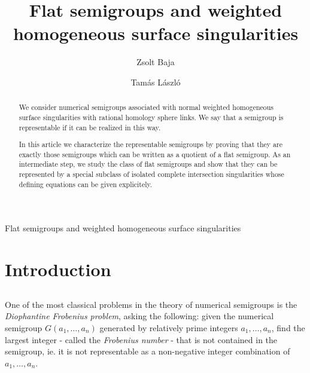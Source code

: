 \documentclass[oneside]{amsart}
\author{Zsolt Baja}
\author{Tam\'as L\'aszl\'o}
\title{Flat semigroups and weighted homogeneous surface singularities}
\numberwithin{equation}{section}
\numberwithin{equation}{subsection}
\theoremstyle{plain}
\theoremstyle{definition}
\begin{document}


\begin{abstract}
We consider numerical semigroups associated with normal weighted homogeneous surface singularities with rational homology sphere links. We say that a semigroup is representable if it can be realized in this way.

In this article we characterize the representable semigroups by proving that they are exactly those semigroups which can be written as a quotient of a flat semigroup. As an intermediate step, we study the class of flat semigroups and show that they can be represented by a special subclass of isolated complete intersection singularities whose defining equations can be given explicitely.
\end{abstract}


\maketitle


\linespread{1.2}




\pagestyle{myheadings}  {{\normalsize Flat semigroups and weighted homogeneous surface singularities}}




\section{Introduction}

\subsection{} 

One of the most classical problems in the theory of numerical semigroups is the {\it Diophantine Frobenius problem}, asking the following: given the numerical semigroup $G(a_1,\dots,a_n)$ generated by relatively prime integers $a_1,\dots,a_n$, find the largest integer - called the {\it Frobenius number} - that is not contained in the semigroup, ie. it is not representable as a non-negative integer combination of $a_1,\dots,a_n$. 
\end{document}

